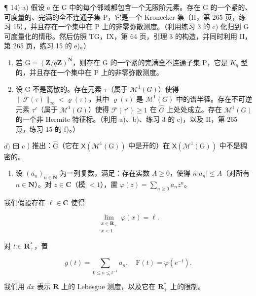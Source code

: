 ¶ 14) a) 假设 e 在 G 中的每个邻域都包含一个无限阶元素。存在 G 的一个紧的、可度量的、完满的全不连通子集 P，它是一个 Kronecker 集（II，第 265 页，练习 15），并且存在一个集中在 P 上的非零弥散测度。（利用练习 3 的 c) 化归到 G 可度量化的情形。然后仿照 TG，IX，第 64 页，引理 3 的构造，并同时利用 II，第 265 页，练习 15 的 e)。）

\begin{enumerate}
\def\labelenumi{\alph{enumi})}
\setcounter{enumi}{1}
\item
  若 \(\mathrm{G} = (\mathbf{Z}/q\mathbf{Z})^{\mathbf{N}}\)，则存在 G 的一个紧的完满全不连通子集 P，它是 \(K_{q}\) 型的，并且存在一个集中在 P 上的非零弥散测度。
\item
  设 G 不是离散的。存在元素 \(\tau\)（属于 \(\mathcal{M}^{1}(G)\)）使得 \(\|\mathcal{F}(\tau)\|_{\infty}<\varrho(\tau)\)，其中 \(\varrho(\tau)\) 是 \(\mathcal{M}^{1}(G)\) 中的谱半径。存在不可逆元素 \(\tau'\)（属于 \(\mathcal{M}^{1}(G)\)）使得 \(\mathcal{F}(\tau')\geqslant1\) 在 \(\widehat{G}\) 上处处成立。存在 \(\mathcal{M}^{1}(G)\) 的一个非 Hermite 特征标。（利用 a)、b)、练习 3 的 c)，以及 II，第 265 页，练习 15 的 f)。）
\end{enumerate}

\(d)\) 由 \(c\) ) 推出：\(\widehat{\mathrm{G}}\)（它在 \(\mathsf{X}(\mathcal{M}^1 (\mathrm{G}))\) 中是开的）在 \(\mathsf{X}(\mathcal{M}^1 (\mathrm{G}))\) 中不是稠密的。


\begin{enumerate}
\def\labelenumi{\arabic{enumi})}
\tightlist
\item
  设 \((a_{n})_{n\in \mathbf{N}}\) 为一列复数，满足：存在实数 \(A\geqslant 0\)，使得 \(n|a_n|\leqslant A\)（对所有 \(n\in \mathbf{N}\)）。对 \(z\in \mathbf{C}\)（模 \(<  1\)），置 \(\varphi (z) = \sum_{n\geqslant 0}a_nz^n\)。
\end{enumerate}

我们假设存在 \(\ell \in \mathbf{C}\) 使得

\[
\lim_{\substack{x\in \mathbf{R}_{+}\\ x <   1}}\varphi (x) = \ell .
\]

对 \(t\in \mathbf{R}_+^*\)，置

\[
g (t) = \sum_ {0 \leqslant n \leqslant t ^ {- 1}} a _ {n}, \quad \mathrm{F} (t) = \varphi (e ^ {- t}).
\]

我们用 \(dx\) 表示 \(\mathbf{R}\) 上的 Lebesgue 测度，以及它在 \(\mathbf{R}_{+}^{*}\) 上的限制。

